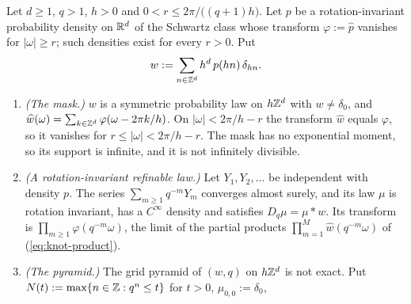 \begin{proposition}
\label{prop:band-limited-refinable-mask}
\notready
{}
Let $d \ge 1$, $q > 1$, $h > 0$ and $0 < r \le 2\pi/\bigl((q + 1)h\bigr)$. Let $p$ be a
rotation-invariant probability density on $\mathbb{R}^d$ of the Schwartz class whose transform
$\varphi := \widehat p$ vanishes for $|\omega| \ge r$; such densities exist for every $r > 0$. Put
\[
  w := \sum_{n \in \mathbb{Z}^d}h^d\,p(hn)\,\delta_{hn} .
\]
\begin{enumerate}
\item \emph{(The mask.)} $w$ is a symmetric probability law on $h\mathbb{Z}^d$ with $w \ne \delta_0$, and
$\widehat w(\omega) = \sum_{k \in \mathbb{Z}^d}\varphi(\omega - 2\pi k/h)$. On $|\omega| < 2\pi/h - r$
the transform $\widehat w$ equals $\varphi$, so it vanishes for $r \le |\omega| < 2\pi/h - r$. The
mask has no exponential moment, so its support is infinite, and it is not infinitely divisible.
\item \emph{(A rotation-invariant refinable law.)} Let $Y_1, Y_2, \dots$ be independent with
density $p$. The series $\sum_{m \ge 1}q^{-m}Y_m$ converges almost surely, and its law $\mu$ is
rotation invariant, has a $C^\infty$ density and satisfies $D_q\mu = \mu * w$. Its transform is
$\prod_{m \ge 1}\varphi(q^{-m}\omega)$, the limit of the partial products
$\prod_{m=1}^M\widehat w(q^{-m}\omega)$ of (\ref{eq:knot-product}).
\item \emph{(The pyramid.)} The grid pyramid of $(w, q)$ on $h\mathbb{Z}^d$ is not exact. Put
$N(t) := \max\{n \in \mathbb{Z} : q^n \le t\}$ for $t > 0$, $\mu_{0,0} := \delta_0$,

\end{enumerate}
\end{proposition}
